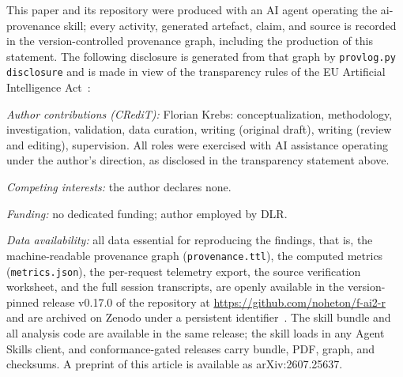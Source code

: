 \documentclass[11pt,a4paper]{article}
\renewcommand{\cite}{\citep} %
\begin{document}
This paper and its repository were produced with an AI agent operating
the ai-provenance skill; every activity, generated artefact, claim, and
source is recorded in the version-controlled provenance graph,
including the production of this statement. The following disclosure is
generated from that graph by \texttt{provlog.py disclosure} and is made
in view of the transparency rules of the EU Artificial Intelligence
Act~\cite{eu-ai-act2024}:

\begingroup\itshape

\endgroup

\emph{Author contributions (CRediT):} Florian Krebs:
conceptualization, methodology, investigation, validation, data
curation, writing (original draft), writing (review and editing),
supervision. All roles were exercised with AI assistance operating
under the author's direction, as disclosed in the transparency
statement above.

\emph{Competing interests:} the author declares none.

\emph{Funding:} no dedicated funding; author employed by DLR.

\emph{Data availability:} all data essential for reproducing the
findings, that is, the machine-readable provenance graph
(\texttt{provenance.ttl}), the computed metrics
(\texttt{metrics.json}), the per-request telemetry export, the source
verification worksheet, and the full session transcripts, are openly
available in the version-pinned release v0.17.0 of the repository at
\url{https://github.com/noheton/f-ai2-r} and are archived on Zenodo
under a persistent identifier~\cite{fair2r-data2026}. The skill
bundle and all analysis code are available in the same release; the
skill loads in any Agent Skills client, and conformance-gated
releases carry bundle, PDF, graph, and checksums. A preprint of this
article is available as arXiv:2607.25637.



\end{document}
